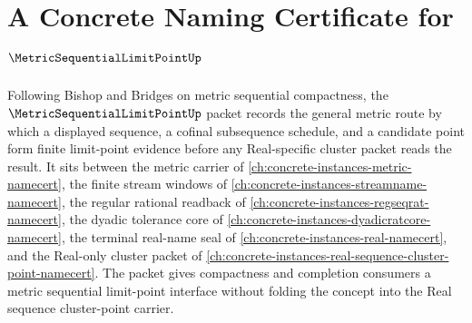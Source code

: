 \chapter{A Concrete Naming Certificate for $\MetricSequentialLimitPointUp$}
\label{ch:concrete-instances-metric-sequential-limit-point-namecert}

Following Bishop and Bridges on metric sequential compactness, the $\MetricSequentialLimitPointUp$ packet records the general metric route by which a displayed sequence, a cofinal subsequence schedule, and a candidate point form finite limit-point evidence before any Real-specific cluster packet reads the result. It sits between the metric carrier of \autoref{ch:concrete-instances-metric-namecert}, the finite stream windows of \autoref{ch:concrete-instances-streamname-namecert}, the regular rational readback of \autoref{ch:concrete-instances-regseqrat-namecert}, the dyadic tolerance core of \autoref{ch:concrete-instances-dyadicratcore-namecert}, the terminal real-name seal of \autoref{ch:concrete-instances-real-namecert}, and the Real-only cluster packet of \autoref{ch:concrete-instances-real-sequence-cluster-point-namecert}. The packet gives compactness and completion consumers a metric sequential limit-point interface without folding the concept into the Real sequence cluster-point carrier.

